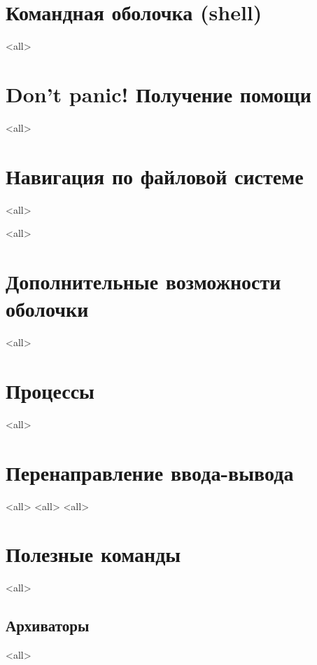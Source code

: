 \section{Командная оболочка (shell)}

\mode<all>{}

\section{Don't panic! Получение помощи}

\mode<all>{}

\section{Навигация по файловой системе}

\mode<all>{}

\mode<all>{}

\section{Дополнительные возможности оболочки}
\mode<all>{}

\section{Процессы}
\mode<all>{}

\section{Перенаправление ввода-вывода}
\mode<all>{}
\mode<all>{}
\mode<all>{}

\section{Полезные команды}

\mode<all>{}

\subsection{Архиваторы}
\mode<all>{}


